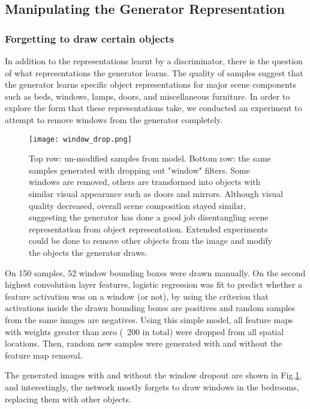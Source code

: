 \documentclass{article} \usepackage{iclr2016_conference,times}
\begin{document}
\subsection{Manipulating the Generator Representation}

\subsubsection{Forgetting to draw certain objects}

In addition to the representations learnt by a discriminator, there is the question of what representations the generator learns. The quality of samples suggest that the generator learns specific object representations for major scene components such as beds, windows, lamps, doors, and miscellaneous furniture. In order to explore the form that these representations take, we conducted an experiment to attempt to remove windows from the generator completely. 

\begin{figure}[h!]
\begin{center}
\texttt{[image: window\_drop.png]}
\end{center}
\caption{\label{fig_LSUN_window_remove}Top row: un-modified samples from model. Bottom row: the same samples generated with dropping out "window" filters. Some windows are removed, others are transformed into objects with similar visual appearance such as doors and mirrors. Although visual quality decreased, overall scene composition stayed similar, suggesting the generator has done a good job disentangling scene representation from object representation. Extended experiments could be done to remove other objects from the image and modify the objects the generator draws.}
\end{figure}

On 150 samples, 52 window bounding boxes were drawn manually. On the second highest convolution layer features, logistic regression was fit to predict whether a feature activation was on a window (or not), by using the criterion that activations inside the drawn bounding boxes are positives and random samples from the same images are negatives. Using this simple model, all feature maps with weights greater than zero (~200 in total) were dropped from all spatial locations. Then, random new samples were generated with and without the feature map removal. 

The generated images with and without the window dropout are shown in Fig.\ref{fig_LSUN_window_remove}, and interestingly, the network mostly forgets to draw windows in the bedrooms, replacing them with other objects.
\end{document}
